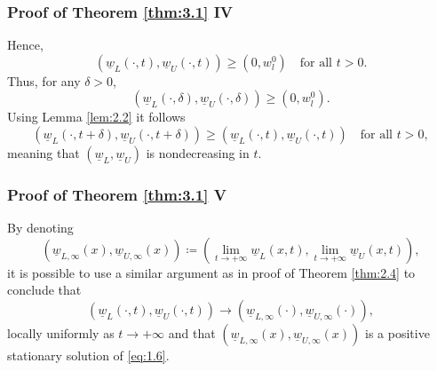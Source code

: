 
\begin{frame}
    \frametitle{Proof of Theorem \ref{thm:3.1} IV}
    \begin{proofc}
        Hence,
        \begin{equation*}
            (\underline{w}_L(\cdot, t), \underline{w}_U(\cdot, t)) \geq (0, w_l^0) \quad \text{for all } t > 0.
        \end{equation*}
        Thus, for any \(\delta > 0\), 
        \begin{equation*}
            (\underline{w}_L(\cdot, \delta), \underline{w}_U(\cdot, \delta)) \geq (0, w_l^0).
        \end{equation*}
        Using Lemma \ref{lem:2.2} it follows
        \begin{equation*}
            (\underline{w}_L(\cdot, t + \delta), \underline{w}_U(\cdot, t + \delta)) \geq (\underline{w}_L(\cdot, t), \underline{w}_U(\cdot, t)) \quad \text{for all } t > 0,
        \end{equation*}
        meaning that \((\underline{w}_L, \underline{w}_U)\) is nondecreasing in \(t\). 
    \end{proofc}
\end{frame}


\begin{frame}
    \frametitle{Proof of Theorem \ref{thm:3.1} V}
    \begin{proofc}
        By denoting 
        \[
            (\underline{w}_{L, \infty}(x), \underline{w}_{U, \infty}(x)) \coloneqq (\lim_{t \to +\infty} \underline{w}_L(x, t), \lim_{t \to +\infty} \underline{w}_U(x, t)), 
        \]
        it is possible to use a similar argument as in proof of Theorem \ref{thm:2.4} to conclude that
        \[
            (\underline{w}_{L}(\cdot, t), \underline{w}_{U}(\cdot, t)) \to (\underline{w}_{L, \infty}(\cdot), \underline{w}_{U, \infty}(\cdot)),
        \]
        locally uniformly as \(t \to +\infty\) and that \((\underline{w}_{L, \infty}(x), \underline{w}_{U, \infty}(x))\) is a positive stationary solution of \eqref{eq:1.6}. 
    \end{proofc}
\end{frame}


